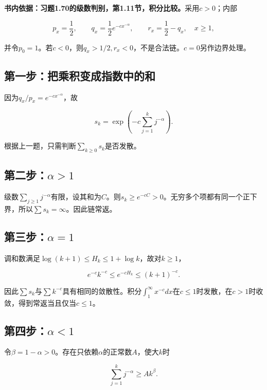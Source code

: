\documentclass[
  11pt,a4paper,UTF8,fontset=fandol]{ctexart}
\begin{document}
\textbf{书内依据：习题1.70的级数判别，第1.11节，积分比较。}采用\(c>0\)；内部

\[p_x=\frac12,\qquad q_x=\frac12e^{-cx^{-\alpha}},\qquad
r_x=\frac12-q_x,\quad x\ge1,\]

并令\(p_0=1\)。若\(c<0\)，则\(q_x>1/2,r_x<0\)，不是合法链。\(c=0\)另作边界处理。

\subsection{第一步：把乘积变成指数中的和}\label{ux7b2cux4e00ux6b65ux628aux4e58ux79efux53d8ux6210ux6307ux6570ux4e2dux7684ux548c}

因为\(q_x/p_x=e^{-cx^{-\alpha}}\)，故

\[s_k=\exp\left(-c\sum_{j=1}^kj^{-\alpha}\right).\]

根据上一题，只需判断\(\sum_{k\ge0}s_k\)是否发散。

\subsection{\texorpdfstring{第二步：\(\alpha>1\)}{第二步：\textbackslash alpha\textgreater1}}\label{ux7b2cux4e8cux6b65alpha1}

级数\(\sum_{j\ge1}j^{-\alpha}\)有限，设其和为\(C\)。则\(s_k\ge e^{-cC}>0\)。无穷多个项都有同一个正下界，所以\(\sum s_k=\infty\)。因此链常返。

\subsection{\texorpdfstring{第三步：\(\alpha=1\)}{第三步：\textbackslash alpha=1}}\label{ux7b2cux4e09ux6b65alpha1}

调和数满足\(\log(k+1)\le H_k\le1+\log k\)，故对\(k\ge1\)，

\[e^{-c}k^{-c}\le e^{-cH_k}\le(k+1)^{-c}.\]

因此\(\sum s_k\)与\(\sum k^{-c}\)具有相同的敛散性。积分\(\int_1^\infty x^{-c}dx\)在\(c\le1\)时发散，在\(c>1\)时收敛，得到常返当且仅当\(c\le1\)。

\subsection{\texorpdfstring{第四步：\(\alpha<1\)}{第四步：\textbackslash alpha\textless1}}\label{ux7b2cux56dbux6b65alpha1}

令\(\beta=1-\alpha>0\)。存在只依赖\(\alpha\)的正常数\(A\)，使大\(k\)时

\[\sum_{j=1}^kj^{-\alpha}\ge A k^\beta.\]
\end{document}
